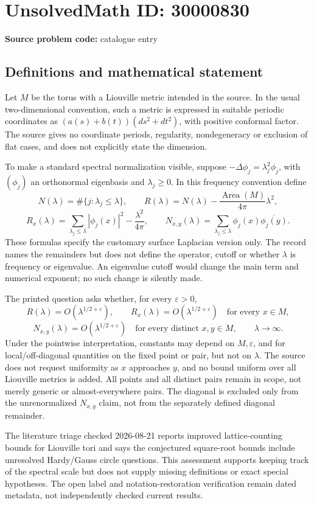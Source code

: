 \documentclass[11pt]{article}
\begin{document}
\section*{UnsolvedMath ID: 30000830}
\textbf{Source problem code:} catalogue entry
\subsection{Definitions and mathematical statement}
Let \(M\) be the torus with a Liouville metric intended in the source. In the usual two-dimensional convention, such a metric is expressed in suitable periodic coordinates as \((a(s)+b(t))(ds^2+dt^2)\), with positive conformal factor. The source gives no coordinate periods, regularity, nondegeneracy or exclusion of flat cases, and does not explicitly state the dimension.

To make a standard spectral normalization visible, suppose \(-\Delta\phi_j=\lambda_j^2\phi_j\), with \((\phi_j)\) an orthonormal eigenbasis and \(\lambda_j\geq0\). In this frequency convention define
\[
 N(\lambda)=\#\{j:\lambda_j\leq\lambda\},\qquad
 R(\lambda)=N(\lambda)-\frac{\operatorname{Area}(M)}{4\pi}\lambda^2,
\]
\[
 R_x(\lambda)=\sum_{\lambda_j\leq\lambda}|\phi_j(x)|^2-\frac{\lambda^2}{4\pi},
 \qquad
 N_{x,y}(\lambda)=\sum_{\lambda_j\leq\lambda}\phi_j(x)\overline{\phi_j(y)}.
\]
These formulas specify the customary surface Laplacian version only. The record names the remainders but does not define the operator, cutoff or whether \(\lambda\) is frequency or eigenvalue. An eigenvalue cutoff would change the main term and numerical exponent; no such change is silently made.

The printed question asks whether, for every \(\varepsilon>0\),
\[
 R(\lambda)=O(\lambda^{1/2+\varepsilon}),\qquad
 R_x(\lambda)=O(\lambda^{1/2+\varepsilon})\quad\text{for every }x\in M,
\]
\[
 N_{x,y}(\lambda)=O(\lambda^{1/2+\varepsilon})
 \quad\text{for every distinct }x,y\in M,
 \qquad\lambda\to\infty.
\]
Under the pointwise interpretation, constants may depend on \(M,\varepsilon\), and for local/off-diagonal quantities on the fixed point or pair, but not on \(\lambda\). The source does not request uniformity as \(x\) approaches \(y\), and no bound uniform over all Liouville metrics is added. All points and all distinct pairs remain in scope, not merely generic or almost-everywhere pairs. The diagonal is excluded only from the unrenormalized \(N_{x,y}\) claim, not from the separately defined diagonal remainder.

The literature triage checked 2026-08-21 reports improved lattice-counting bounds for Liouville tori and says the conjectured square-root bounds include unresolved Hardy/Gauss circle questions. This assessment supports keeping track of the spectral scale but does not supply missing definitions or exact special hypotheses. The open label and notation-restoration verification remain dated metadata, not independently checked current results.
\end{document}
